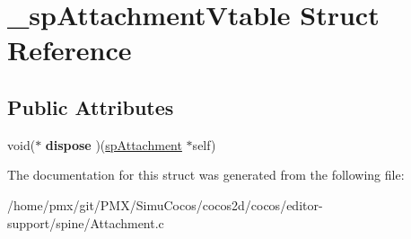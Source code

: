 \hypertarget{struct__spAttachmentVtable}{}\section{\+\_\+sp\+Attachment\+Vtable Struct Reference}
\label{struct__spAttachmentVtable}
\subsection*{Public Attributes}
\begin{DoxyCompactItemize}
\item 
\mbox{\label{struct__spAttachmentVtable_a20234e9d9c591b1322a499da1be88ed4}} 
void($\ast$ {\bfseries dispose} )(\hyperlink{structspAttachment}{sp\+Attachment} $\ast$self)
\end{DoxyCompactItemize}


The documentation for this struct was generated from the following file\+:\begin{DoxyCompactItemize}
\item 
/home/pmx/git/\+P\+M\+X/\+Simu\+Cocos/cocos2d/cocos/editor-\/support/spine/Attachment.\+c\end{DoxyCompactItemize}
